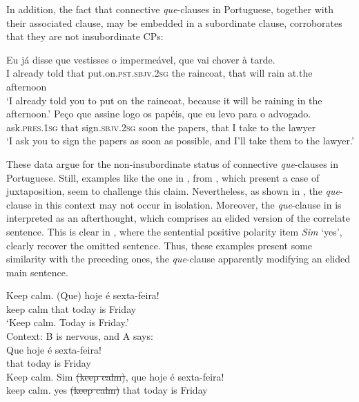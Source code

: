 \documentclass[output=paper,colorlinks,citecolor=brown,
]{langscibook}
\begin{document}
In addition, the fact that connective \textit{que}-clauses in Portuguese, together with their associated clause, may be embedded in a subordinate clause, corroborates that they are not insubordinate CPs:

\ea \label{ex:matos:vestisses}
 \ea \label{ex:matos:vestisses-a}
 \gll Eu já disse que vestisses o impermeável, que vai chover à tarde. \\
      I already told that put.on.\textsc{pst}.\textsc{sbjv}.\textsc{2sg} the raincoat, that will rain at.the afternoon\\
 \glt ‘I already told you to put on the raincoat, because it will be raining in the afternoon.'
 \ex \label{ex:matos:peco-que-assines}
 \gll Peço que assine logo os papéis, que eu levo para o advogado.\\
	  ask.\textsc{pres}.\textsc{1sg} that sign.\textsc{sbjv}.\textsc{2sg} soon the papers, that I take to the lawyer\\
 \glt ‘I ask you to sign the papers as soon as possible, and I’ll take      them to the lawyer.’
 \z
\z 

These data argue for the non-insubordinate status of connective \textit{que}-clauses in Portuguese. Still, examples like the one in , from \citet{kocher_unselected_2019}, which present a case of juxtaposition, seem to challenge this claim. Nevertheless, as shown in , the \textit{que}-clause in this context may not occur in isolation. Moreover, the \textit{que}-clause in  is interpreted as an afterthought, which comprises an elided version of the correlate sentence. This is clear in , where the sentential positive polarity item \textit{Sim} ‘yes’, clearly recover the omitted sentence. Thus, these examples present some similarity with the preceding ones, the \textit{que}-clause apparently modifying an elided main sentence.


\ea \label{ex:matos:friday}
 \ea \label{ex:matos:friday-a}
 \gll Keep calm. (Que) hoje é sexta-feira! \\
      keep calm that today is Friday\\
 \glt ‘Keep calm. Today is Friday.’ \\\citep[148]{kocher_unselected_2019}
 \ex \label{ex:matos:friday-b}
 Context: B is nervous, and A says:\\
 \gll {*} Que hoje é sexta-feira!\\
      {} that today is Friday\\
 \ex \label{ex:matos:friday-c}
 \gll Keep calm. Sim \sout{(keep calm)}, que hoje é sexta-feira!\\
      keep calm. yes \sout{(keep calm)} that today is Friday\\
 \z
\z 
\end{document}
